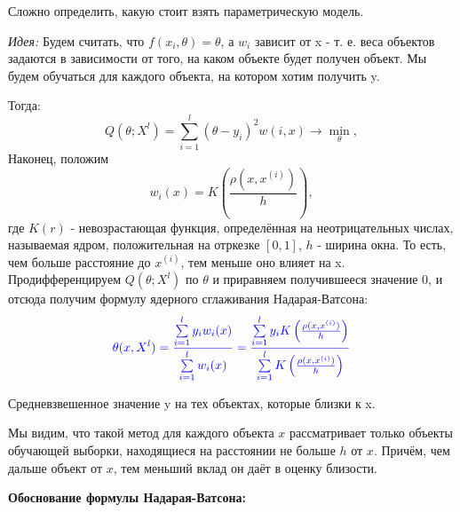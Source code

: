 Сложно определить, какую стоит взять параметрическую модель.

\textit{Идея:}
Будем считать, что $f(x_i, \theta)=\theta$,  а $w_i$ зависит от x - т. е. веса объектов задаются в зависимости от того, на каком объекте будет получен объект.
Мы будем обучаться для каждого объекта, на котором хотим получить y.

Тогда:
\begin{equation*}
    \displaystyle Q(\theta; X^l) =  \sum\limits_{i=1}^l(\theta-y_i)^2w(i,x) \longrightarrow \min_\theta,
\end{equation*}
Наконец, положим
\begin{equation*}
    \displaystyle w_i(x) = K\left(\frac{\rho(x, x^{(i)})}{h}\right),
\end{equation*}
где $K(r)$ - невозрастающая функция, определённая на неотрицательных числах, называемая ядром, положительная на отркезке $[0,1]$, $h$ - ширина окна. То есть, чем больше расстояние до $x^{(i)}$, тем меньше оно влияет на x.
\\ Продифференцируем $Q(\theta; X^l)$ по $\theta$ и приравняем получившееся значение 0, и отсюда получим формулу ядерного сглаживания Надарая-Ватсона:
\begin{equation*}
   \textcolor{blue} {\theta(x, X^l)= \frac{\sum\limits_{i=1}^ly_iw_i(x)}{\sum\limits_{i=1}^lw_i(x)}= \frac{\sum\limits_{i=1}^ly_iK\left(\frac{\rho(x, x^{(i)})}{h}\right)}{\sum\limits_{i=1}^lK\left(\frac{\rho(x, x^{(i)})}{h}\right)}}
\end{equation*}

Средневзвешенное значение y на тех объектах, которые близки к x.

Мы видим, что такой метод для каждого объекта $x$ рассматривает только объекты обучающей выборки, находящиеся на расстоянии не больше $h$ от $x$. Причём, чем дальше объект от $x$, тем  меньший вклад он даёт в оценку близости.



\textbf{Обоснование формулы Надарая-Ватсона:}

